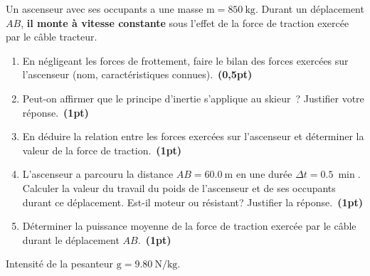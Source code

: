 Un ascenseur avec ses occupants a une masse $\mathrm{m}=\qty{850}{\kg}$. Durant
un déplacement $AB$, \textbf{il monte à vitesse constante} sous l'effet de la
force de traction exercée par le câble tracteur.
\begin{enumerate}
    \item En négligeant les forces de frottement, faire le bilan des forces
          exercées sur l'ascenseur (nom, caractéristiques
          connues).~\textbf{(0,5pt)}
    \item Peut-on affirmer que le principe d'inertie s'applique au skieur~?
          Justifier votre réponse.~\textbf{(1pt)}
    \item En déduire la relation entre les forces exercées sur l'ascenseur et
          déterminer la valeur de la force de traction.~\textbf{(1pt)}
    \item L'ascenseur a parcouru la distance $AB=\qty{60.0}{\m}$ en une durée
          $\Delta t=\qty{0.5}{\min}$. Calculer la valeur du travail du poids de
          l'ascenseur et de ses occupants durant ce déplacement. Est-il moteur
          ou résistant? Justifier la réponse.~\textbf{(1pt)}
    \item Déterminer la puissance moyenne de la force de traction exercée par le
          câble durant le déplacement $AB$.~\textbf{(1pt)}
\end{enumerate}
\begin{donnees}
    Intensité de la pesanteur $\mathrm{g}=\qty{9.80}{\N\per\kg}$.
\end{donnees}
